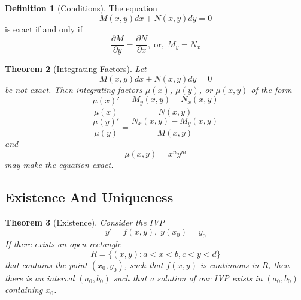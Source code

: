 \documentclass[12pt]{article}
\newtheorem{thm}{Theorem}[section]
\theoremstyle{definition}
\newtheorem{defn}[thm]{Definition}
\theoremstyle{remark}
\numberwithin{equation}{section}
\begin{document}
\begin{defn}[Conditions]
        The equation \begin{equation}
                M(x,y)dx + N(x,y)dy = 0
        \end{equation}
        is exact if and only if \begin{equation}
                \frac{\partial M}{\partial y} = \frac{\partial N}{\partial x},\;\text{or},\;M_y = N_x 
        \end{equation}
\end{defn}


\vspace{1cm}


\begin{thm}[Integrating Factors]
        Let \begin{equation}
                M(x,y)dx + N(x,y)dy = 0
        \end{equation}
        be not exact. Then integrating factors $\mu(x)$, $\mu(y)$, or $\mu(x,y)$ of the form \begin{equation}
                \frac{\mu(x)'}{\mu(x)} = \frac{M_y(x,y) - N_x(x,y)}{N(x,y)}
        \end{equation}
        \begin{equation}
                \frac{\mu(y)'}{\mu(y)} = \frac{N_x(x,y) - M_y(x,y)}{M(x,y)}
        \end{equation}
        and \begin{equation}
                \mu(x,y) = x^ny^m
        \end{equation}
        may make the equation exact.
\end{thm}


\vspace{1cm}


\subsection{Existence And Uniqueness}


\begin{thm}[Existence]
        Consider the IVP \begin{equation}
                y' = f(x,y),\;y(x_0) =y_0
        \end{equation}
        If there exists an open rectangle \begin{equation}
                R = \{(x,y):a < x < b, c< y < d\}
        \end{equation}
        that contains the point $(x_0,y_0)$, such that $f(x,y)$ is continuous in R, then there is an interval $(a_0,b_0)$ such that a solution of our IVP exists in $(a_0,b_0)$ containing $x_0$.
\end{thm}
\end{document}
